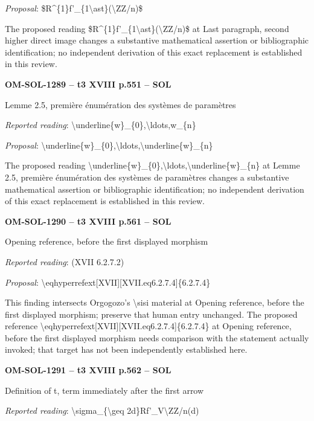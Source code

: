 \emph{Proposal}: \$R\textasciicircum{}\{1\}f'\_\{1\textbackslash{}ast\}(\textbackslash{}ZZ/n)\$\par
The proposed reading \$R\textasciicircum{}\{1\}f'\_\{1\textbackslash{}ast\}(\textbackslash{}ZZ/n)\$ at Last paragraph, second higher direct image changes a substantive mathematical assertion or bibliographic identification; no independent derivation of this exact replacement is established in this review.\par
\par\noindent\textbf{OM-SOL-1289 -- t3 XVIII p.551 -- SOL}\par
Lemme 2.5, première énumération des systèmes de paramètres\par
\emph{Reported reading}: \textbackslash{}underline\{w\}\_\{0\},\textbackslash{}ldots,w\_\{n\}\par
\emph{Proposal}: \textbackslash{}underline\{w\}\_\{0\},\textbackslash{}ldots,\textbackslash{}underline\{w\}\_\{n\}\par
The proposed reading \textbackslash{}underline\{w\}\_\{0\},\textbackslash{}ldots,\textbackslash{}underline\{w\}\_\{n\} at Lemme 2.5, première énumération des systèmes de paramètres changes a substantive mathematical assertion or bibliographic identification; no independent derivation of this exact replacement is established in this review.\par
\par\noindent\textbf{OM-SOL-1290 -- t3 XVIII p.561 -- SOL}\par
Opening reference, before the first displayed morphism\par
\emph{Reported reading}: (XVII 6.2.7.2)\par
\emph{Proposal}: \textbackslash{}eqhyperrefext[XVII][XVII.eq6.2.7.4]\{6.2.7.4\}\par
This finding intersects Orgogozo's \textbackslash{}sisi material at Opening reference, before the first displayed morphism; preserve that human entry unchanged. The proposed reference \textbackslash{}eqhyperrefext[XVII][XVII.eq6.2.7.4]\{6.2.7.4\} at Opening reference, before the first displayed morphism needs comparison with the statement actually invoked; that target has not been independently established here.\par
\par\noindent\textbf{OM-SOL-1291 -- t3 XVIII p.562 -- SOL}\par
Definition of t, term immediately after the first arrow\par
\emph{Reported reading}: \textbackslash{}sigma\_\{\textbackslash{}geq 2d\}Rf'\_V\textbackslash{}ZZ/n(d)\par
